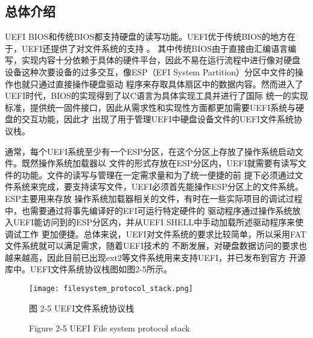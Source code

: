 \subsection{总体介绍}
UEFI BIOS和传统BIOS都支持硬盘的读写功能。UEFI优于传统BIOS的地方在于，UEFI还提供了对文件系统的支持
\cite{english18}。
其中传统BIOS由于直接由汇编语言编写，实现内容十分依赖于具体的硬件平台，因此不易在运行流程中进行像对硬盘
设备这种次要设备的过多交互，像ESP（EFI System Partition）分区中文件的操作也就只通过直接操作硬盘驱动
程序来存取具体扇区中的数据内容。然而进入了UEFI时代，BIOS的实现得到了以C语言为具体实现工具并进行了国际
统一的实现标准，提供统一固件接口，因此从需求性和实现性方面都更加需要UEFI系统与硬盘的交互功能，因此才
出现了用于管理UEFI中硬盘设备文件的UEFI文件系统协议栈。
\par 通常，每个UEFI系统至少有一个ESP分区，在这个分区上存放了操作系统启动文件。既然操作系统加载器以
文件的形式存放在ESP分区内，UEFI就需要有读写文件的功能。文件的读写与管理在一定需求量和为了统一便捷的前
提下必须通过文件系统来完成，要支持读写文件，UEFI必须首先能操作ESP分区上的文件系统。ESP主要用来存放
操作系统加载器相关的文件，有时在一些实际项目的调试过程中，也需要通过将事先编译好的EFI可运行特定硬件的
驱动程序通过操作系统放入UEFI能访问到的ESP分区内，并从UEFI SHELL中手动加载所述驱动程序来使调试工作
更加便捷。总体来说，UEFI对文件系统的要求比较简单，所以采用FAT文件系统就可以满足需求，随着UEFI技术的
不断发展，对硬盘数据访问的要求也越来越高，因此目前已出现ext2等文件系统用来支持UEFI，并已发布到官方
开源库中。UEFI文件系统协议栈图如图2-5所示。

\begin{figure}[htb]
    \label{ffs_format}
    \vspace{0cm}   
    \setlength{\abovecaptionskip}{0.3cm}  
	\centering
    \texttt{[image: filesystem\_protocol\_stack.png]}
    \caption*{图 2-5 UEFI文件系统协议栈}
    \setlength{\belowcaptionskip}{-0.7cm}
    \caption*{Figure 2-5 UEFI File system protocol stack}
\end{figure}

